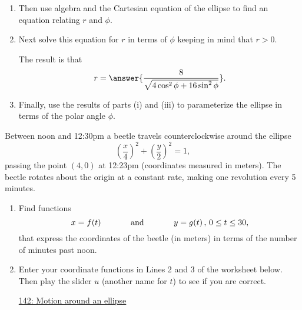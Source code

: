 \documentclass{ximera}
\begin{document}
\begin{example}
\begin{enumerate}
\begin{enumerate}
\item Then use algebra and the Cartesian equation of the ellipse to find an equation relating $r$ and $\phi$.

\item Next solve this equation for $r$ in terms of $\phi$ keeping in mind that $r>0$.

The result is that
\[
  r = \answer{\frac{8}{\sqrt{4\cos^2\phi + 16\sin^2\phi }}} .
\]

\item Finally, use the results of parts (i) and (iii) to parameterize the ellipse in terms of the polar angle $\phi$.
\end{enumerate}

\end{enumerate}
\end{example}

\begin{example} \label{Ex:8UDUREGDFGD}
Between noon and 12:30pm a beetle travels counterclockwise around the ellipse
\[
         \left(  \frac{x}{4} \right)^2 + \left(  \frac{y}{2} \right)^2  = 1 ,
\]
passing the point $(4,0)$ at 12:23pm (coordinates measured in meters). The beetle rotates about the origin at a constant rate, making one revolution every 5 minutes. 

\begin{enumerate}

\item Find functions
\[
    x = f(t)  \hskip 0.5 in \text{and} \hskip 0.5 in y=g(t) \, , \, 0\leq t \leq 30 ,
\]
that express the coordinates of the beetle (in meters) in terms of the number of minutes past noon.

\item Enter your coordinate functions in Lines 2 and 3 of the worksheet below. Then play the slider $u$ (another name for $t$) to see if you are correct.

\begin{onlineOnly}
    \begin{center}
\end{center}
\end{onlineOnly}

\href{https://www.desmos.com/calculator/goeo2vvdvi}{142: Motion around an ellipse}




\end{enumerate}
\end{example}
\end{document}

